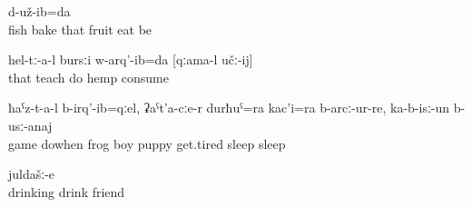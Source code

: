 \begin{enumerate}
\begin{exe}
		\ex	\label{ex:Frying fish, eating fruits we stayed}
			d-už-ib=da\\
			fish	bake	that	fruit	eat	be\\
		\glt	{}
	
		\ex	\label{ex:‎‎They taught me to smoke marihuana}
		\gll	hel-tː-a-l	bursːi	w-arq'-ib=da	[qːama-l	učː-ij]\\
			that	teach	do	hemp	consume\\
		\glt	{}
	
	\ex	\label{ex:‎When they played with the frog, the boy and his dog got tired and played down to sleep}
		\gll	ħaˁz-t-a-l	b-irq'-ib=qːel,	ʡaˁt'a-cːe-r	durħuˁ=ra	kac'i=ra b-arcː-ur-re,	ka-b-isː-un	b-usː-anaj\\
			game	dowhen	frog	boy\tsc{=add}	puppy	get.tired	sleep	sleep\\
		\glt	{}
		
		\ex	\label{ex:the drinking friends}
			juldašː-e\\
			drinking	drink	friend\\
		\glt	{}
	\end{exe}


\end{enumerate}
